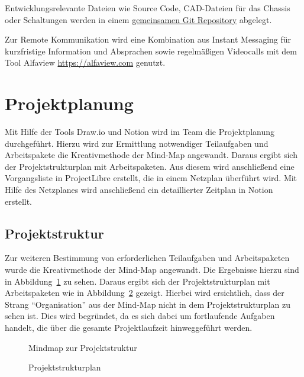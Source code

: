 \documentclass[
  a4paper,
  12pt,
  DIV=12,        %
  parskip=half,  %
  headings=small %
]{scrartcl}
\theoremstyle{definition}
\theoremstyle{definition}
\begin{document}
Entwicklungsrelevante Dateien wie Source Code, CAD-Dateien für das Chassis oder Schaltungen werden in einem \href{https://github.com/Project-CoasterBot/coasterbot}{gemeinsamen Git Repository} abgelegt. %

Zur Remote Kommunikation wird eine Kombination aus Instant Messaging für kurzfristige Information und Absprachen sowie regelmäßigen Videocalls mit dem Tool Alfaview \url{https://alfaview.com} genutzt.




\section{Projektplanung}

Mit Hilfe der Tools Draw.io und Notion wird im Team die Projektplanung durchgeführt. Hierzu wird zur Ermittlung notwendiger Teilaufgaben und Arbeitspakete die Kreativmethode der Mind-Map angewandt. Daraus ergibt sich der Projektstrukturplan mit Arbeitspaketen. Aus diesem wird anschließend eine Vorgangsliste in ProjectLibre erstellt, die in einem Netzplan überführt wird. Mit Hilfe des Netzplanes wird anschließend ein detaillierter Zeitplan in Notion erstellt.

\subsection{Projektstruktur}
Zur weiteren Bestimmung von erforderlichen Teilaufgaben und Arbeitspaketen wurde die Kreativmethode der Mind-Map angewandt. Die Ergebnisse hierzu sind in Abbildung~\ref{arbeitspaketemindmap} zu sehen. Daraus ergibt sich der Projektstrukturplan mit Arbeitspaketen wie in Abbildung~\ref{projektstrukturplan} gezeigt. Hierbei wird ersichtlich, dass der Strang ``Organisation''   aus der Mind-Map nicht in dem Projektstrukturplan zu sehen ist. Dies wird begründet, da es sich dabei um fortlaufende Aufgaben handelt, die über die gesamte Projektlaufzeit hinweggeführt werden.

\begin{figure}[htbp]
  \centering
  
  \caption{Mindmap zur Projektstruktur}\label{arbeitspaketemindmap}
\end{figure}

\begin{figure}[htbp]
  \centering
  
  \caption{Projektstrukturplan}\label{projektstrukturplan}
\end{figure}
\end{document}
